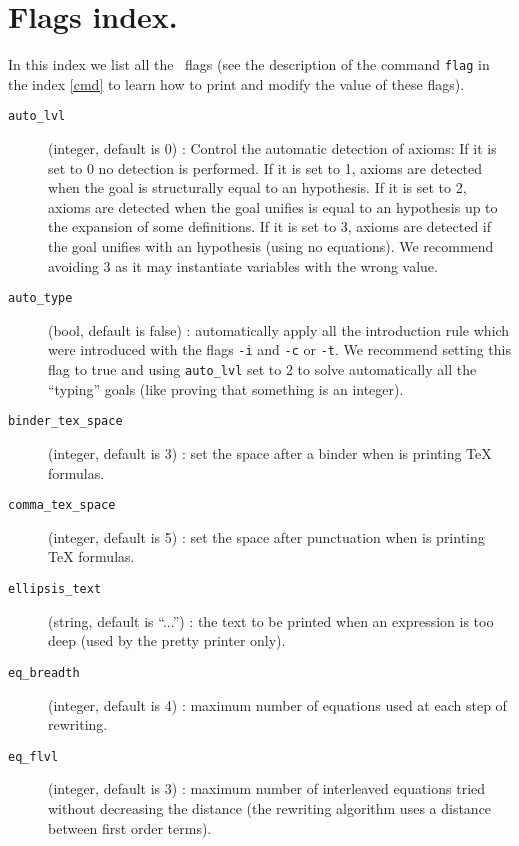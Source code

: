 
\chapter{Flags index.}\label{flag}

In this index we list all the \AFD\ flags (see the description of the command
{\tt flag} in the index \ref{cmd} to learn how to print and modify the value of
these flags).

\begin{description}
  \item [\tt auto\_lvl] (integer, default is 0) : Control the
  automatic detection of axioms: If it is set to 0 no detection is
  performed. If it is set to 1, axioms are detected when the goal is
  structurally equal to an hypothesis. If it is set to 2, axioms are
  detected when the goal unifies is equal to an hypothesis up to the
  expansion of some definitions. If it is set to 3, axioms are
  detected if the goal unifies with an hypothesis (using no
  equations). We recommend avoiding 3 as it may instantiate variables
  with the wrong value.

  \item [\tt auto\_type] (bool, default is false) : automatically
apply all the introduction rule which were introduced with the flags
{\tt -i} and {\tt -c} or {\tt -t}. We recommend setting this flag to
true and using {\tt auto\_lvl} set to 2 to solve automatically all the
``typing'' goals (like proving that something is an integer).

  \item [\tt binder\_tex\_space] (integer, default is 3) : set the space after
    a binder when \AFD is printing TeX formulas.

  \item [\tt comma\_tex\_space] (integer, default is 5) : set the space after
    punctuation when \AFD is printing TeX formulas.

  \item [\tt ellipsis\_text] (string, default is ``...'') : the text to be
    printed when an expression is too deep (used by the pretty printer only).

  \item [\tt eq\_breadth] (integer, default is 4) : maximum number of
    equations used at each step of rewriting.

  \item [\tt eq\_flvl] (integer, default is 3) : maximum number of
    interleaved equations tried without decreasing the distance (the
    rewriting algorithm uses a distance between first order terms).


\end{description}
